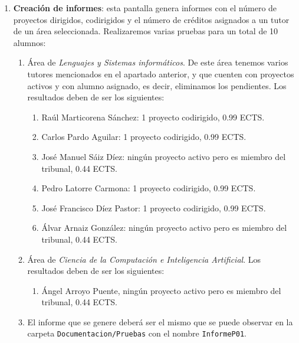 \begin{enumerate}
	
	\item \textbf{Creación de informes}: esta pantalla genera informes con el número de proyectos dirigidos, codirigidos y el número de créditos asignados a un tutor de un área seleccionada. Realizaremos varias pruebas para un total de 10 alumnos:
		\begin{enumerate}
			\item Área de \emph{Lenguajes y Sistemas informáticos}. De este área tenemos varios tutores mencionados en el apartado anterior, y que cuenten con proyectos activos y con alumno asignado, es decir, eliminamos los pendientes. Los resultados deben de ser los siguientes:
				\begin{enumerate}
					\item Raúl Marticorena Sánchez: 1 proyecto codirigido, 0.99 ECTS.
					\item Carlos Pardo Aguilar: 1 proyecto codirigido, 0.99 ECTS.					
					\item José Manuel Sáiz Díez: ningún proyecto activo pero es miembro del tribunal, 0.44 ECTS.
					\item Pedro Latorre Carmona: 1 proyecto codirigido, 0.99 ECTS.						
					\item José Francisco Díez Pastor: 1 proyecto codirigido, 0.99 ECTS.										
					\item Álvar Arnaiz González: ningún proyecto activo pero es miembro del tribunal, 0.44 ECTS.					
				\end{enumerate}
			\item Área de \emph{Ciencia de la Computación e Inteligencia Artificial}. Los resultados deben de ser los siguientes:
			\begin{enumerate}
				\item Ángel Arroyo Puente, ningún proyecto activo pero es miembro del tribunal, 0.44 ECTS.							
			\end{enumerate}
			\item El informe que se genere deberá ser el mismo que se puede observar en la carpeta \texttt{Documentacion/Pruebas} con el nombre \texttt{InformeP01}.
		\end{enumerate}


\end{enumerate}
